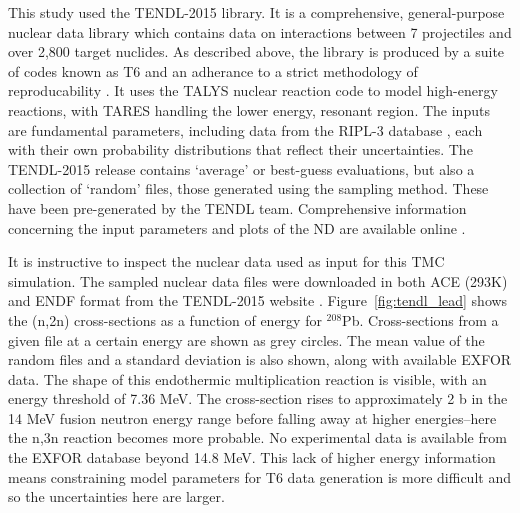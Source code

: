 
This study used the TENDL-2015 library. It is a comprehensive, general-purpose nuclear data library which contains data on interactions between 7 projectiles and over 2,800 target nuclides. As described above, the library is produced by a suite of codes known as T6 and an adherance to a strict methodology of reproducability \cite{Rochman2016}. It uses the TALYS nuclear reaction code to model high-energy reactions, with TARES handling the lower energy, resonant region. The inputs are fundamental parameters, including data from the RIPL-3 database \cite{Capote2009}, each with their own probability distributions that reflect their uncertainties. The TENDL-2015 release contains `average' or best-guess evaluations, but also a collection of `random' files, those generated using the sampling method. These have been pre-generated by the TENDL team. Comprehensive information concerning the input parameters and plots of the ND are available online \cite{TENDL2015}.

It is instructive to inspect the nuclear data used as input for this TMC simulation. The sampled nuclear data files were downloaded in both ACE (293K) and ENDF format from the TENDL-2015 website \cite{TENDL2015}. Figure~\ref{fig:tendl_lead} shows the (n,2n) cross-sections as a function of energy for $^{208}$Pb. Cross-sections from a given file at a certain energy are shown as grey circles. The mean value of the random files and a standard deviation is also shown, along with available EXFOR data. The shape of this endothermic multiplication reaction is visible, with an energy threshold of 7.36 MeV. The cross-section rises to approximately 2 b in the 14 MeV fusion neutron energy range before falling away at higher energies--here the n,3n reaction becomes more probable. No experimental data is available from the EXFOR database beyond 14.8 MeV. This lack of higher energy information means constraining model parameters for T6 data generation is more difficult and so the uncertainties here are larger.


